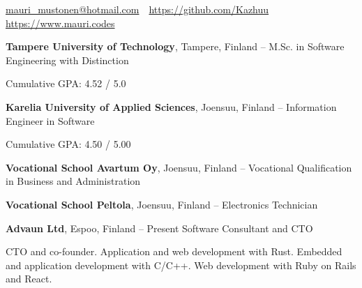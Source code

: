\documentclass[letterpaper,MMMyyyy,nonstopmode]{simpleresumecv}
\newcommand{\CVAuthor}{Mauri Mustonen}
\newcommand{\CVWebpage}{https://www.mauri.codes}
\begin{document}

\Title{\CVAuthor}

\begin{SubTitle}
    \par
    \href{mailto:mauri\_mustonen@hotmail.com}{mauri\_mustonen@hotmail.com}\,
    \SubBulletSymbol\,
    \href{https://github.com/Kazhuu}{https://github.com/Kazhuu}\,
    \SubBulletSymbol\,
    \href{\CVWebpage}{\url{\CVWebpage}}
\end{SubTitle}

\begin{Body}



\Entry
\textbf{Tampere University of Technology}, Tampere, Finland
\hfill
{} -- 
\Gap
\BulletItem
M.Sc. in Software Engineering with Distinction
\begin{Detail}
    \SubBulletItem Cumulative GPA: 4.52 / 5.0
\end{Detail}

\BigGap
\Entry
\textbf{Karelia University of Applied Sciences}, Joensuu, Finland
\hfill
{} -- 
\Gap
\BulletItem
Information Engineer in Software
\begin{Detail}
    \SubBulletItem Cumulative GPA: 4.50 / 5.00
\end{Detail}

\BigGap
\Entry
\textbf{Vocational School Avartum Oy}, Joensuu, Finland
\hfill
{} -- 
\Gap
\BulletItem
Vocational Qualification in Business and Administration

\BigGap
\Entry
\textbf{Vocational School Peltola}, Joensuu, Finland
\hfill
{} -- 
\Gap
\BulletItem
Electronics Technician



\Entry
\BigGap
\Entry
\textbf{Advaun Ltd}, Espoo, Finland
\hfill
{} -- Present
\Gap
\BulletItem Software Consultant and CTO
\begin{Detail}
    \SubBulletItem CTO and co-founder.
    \SubBulletItem Application and web development with Rust.
    \SubBulletItem Embedded and application development with C/C++.
    \SubBulletItem Web development with Ruby on Rails and React.
\end{Detail}


\end{Body}
\end{document}
